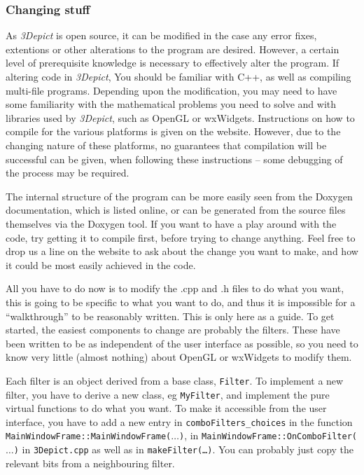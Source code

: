 \documentclass[10pt]{article}
\begin{document}
\subsubsection{Changing stuff}
As \emph{3Depict} is open source, it can be modified in the case any error fixes, extentions or other alterations to the program are  desired. However, a certain level of prerequisite knowledge is necessary to effectively alter the program. If altering code in \emph{3Depict}, You should be familiar with C++, as well as compiling multi-file programs. Depending upon the modification, you may need to have some familiarity with the mathematical problems you need to solve and with libraries used by \emph{3Depict}, such as OpenGL or wxWidgets. Instructions on how to compile for the various platforms is given on the website. However, due to the changing nature of these platforms, no guarantees that compilation will be successful can be given, when following these instructions -- some debugging of the process may be required.


The internal structure of the program can be more easily seen from the Doxygen documentation, which is listed online, or can be generated from the source files themselves via the Doxygen tool. If you want to have a play around with the code, try getting it to compile first, before trying to change anything. Feel free to drop us a line on the website to ask about the change you want to make, and how it could be most easily achieved in the code.

All you have to do now is to modify the .cpp and .h files to do what you want, this is going to be specific to what you want to do, and thus it is impossible for a ``walkthrough'' to be reasonably written. This is only here as a guide. To get started, the easiest components to change are probably the filters. These have been written to be as independent of the user interface as possible, so you need to know very little (almost nothing) about OpenGL or wxWidgets to modify them. 

Each filter is an object derived from a base class, \texttt{Filter}.  To implement a new filter, you have to derive a new class, eg \texttt{MyFilter}, and implement the pure virtual functions to do what you want. To make it accessible from the user interface, you have to add a new entry in  \texttt{comboFilters\_choices} in the function \texttt{MainWindowFrame::MainWindowFrame($\ldots$)}, in \texttt{MainWindowFrame::OnComboFilter($\ldots$)} in \texttt{3Depict.cpp} as well as in \texttt{makeFilter(\ldots)}. You can probably just copy the relevant bits from a neighbouring filter.
\end{document}
